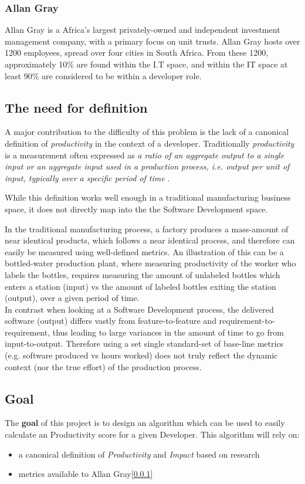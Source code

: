 \subsubsection{Allan Gray}
\label{sec:allan_gray}
Allan Gray\cite{allan_gray} is a Africa's largest privately-owned and independent investment management company, with a primary focus on unit trusts.
Allan Gray hosts over 1200 employees, spread over four cities in South Africa. From these 1200, approximately 10\% are found within the I.T space,
and within the IT space at least 90\% are considered to be within a developer role.

\subsection{The need for definition}
A major contribution to the difficulty of this problem is the lack of a canonical definition of \emph{productivity} in the context of a developer.
Traditionally \emph{productivity} is a measurement often expressed as \emph{a ratio of an aggregate output to a single input or an aggregate input used in a production process, i.e. output per unit of input, typically over a specific period of time} \cite{kaliski_2001}.

While this definition works well enough in a traditional manufacturing business space, it does not directly map into the the Software Development space.

In the traditional manufacturing process, a factory produces a mass-amount of near identical products, which follows a near identical process, and therefore can easily be measured using well-defined metrics.
An illustration of this can be a bottled-water production plant, where measuring productivity of the worker who labels the bottles, requires measuring the amount of unlabeled bottles which enters a station (input) vs the amount of labeled bottles exiting the station (output), over a given period of time.\\
\noindent In contrast when looking at a Software Development process, the delivered software (output) differs vastly from feature-to-feature and requirement-to-requirement, thus leading to large variances in the amount of time to go from input-to-output.
Therefore using a set single standard-set of base-line metrics (e.g. software produced vs hours worked) does not truly reflect the dynamic context (nor the true effort) of the production process.

\subsection{Goal}
\noindent The \textbf{goal} of this project is to design an algorithm which can be used to easily calculate an Productivity score for a given Developer.
This algorithm will rely on:
\begin{itemize}
  \item a canonical definition of \textit{Productivity} and \textit{Impact} based on research
  \item metrics available to Allan Gray[\ref{sec:allan_gray}]
\end{itemize}

